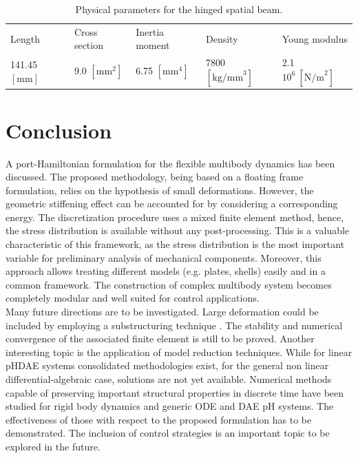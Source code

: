\documentclass{svjour3}                     %
\begin{document}
\begin{table}[tb]
	\caption{Physical parameters for the hinged spatial beam.}
	\label{tab:data_3Dbeam}       %
	\begin{tabular}{lllll}
		\hline\noalign{\smallskip}
		Length & Cross section & Inertia moment & Density & Young modulus \\
		\noalign{\smallskip}\hline\noalign{\smallskip}
		141.45 $[\mathrm{mm}]$ & 9.0 $[\mathrm{mm}^2]$ & 6.75 $[\mathrm{mm}^4]$ & 7800 $[\mathrm{kg/mm}^3]$ & 2.1 $10^6 \ [\mathrm{N/m}^2]$  \\
		\hline
	\end{tabular}
\end{table}


\section{Conclusion}
A port-Hamiltonian formulation for the flexible multibody dynamics has been discussed. The proposed methodology, being based on a floating frame formulation, relies on the hypothesis of small deformations. However, the geometric stiffening effect can be accounted for by considering a corresponding energy. The discretization procedure uses a mixed finite element method, hence, the stress distribution is available without any post-processing. This is a valuable characteristic of this framework, as the stress distribution is the most important variable for preliminary analysis of mechanical components. Moreover, this approach allows treating different models (e.g. plates, shells) easily and in a common framework. The construction of complex multibody system becomes completely modular and well suited for control applications.  \\
Many future directions are to be investigated. Large deformation could be included by employing a substructuring technique \cite{SHABANA_substructure}.
The stability and numerical convergence of the associated finite element is still to be proved. Another interesting topic is the application of model reduction techniques. While for linear pHDAE systems consolidated methodologies exist, for the general non linear differential-algebraic case, solutions are not yet available. Numerical methods capable of preserving important structural properties in discrete time have been studied for rigid body dynamics \cite{celledoni2018passivity} and generic ODE \cite{KOTYCZKA_dt} and DAE \cite{mehrmann2019structurepreserving} pH systems. The effectiveness of those with respect to the proposed formulation has to be demonstrated.  The inclusion of control strategies is an important topic to be explored in the future.
\end{document}
